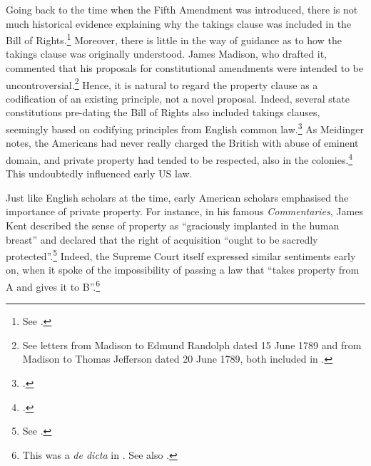 Going back to the time when the Fifth Amendment was introduced, there is not much historical evidence explaining why the takings clause was included in the Bill of Rights.\footnote{See \cite{fifth}.} Moreover, there is little in the way of guidance as to how the takings clause was originally understood. James Madison, who drafted it, commented that his proposals for constitutional amendments were intended to be uncontroversial.\footnote{See letters from Madison to Edmund Randolph dated 15 June 1789 and from Madison to Thomas Jefferson dated 20 June 1789, both included in \cite{madison79}.} Hence, it is natural to regard the property clause as a codification of an existing principle, not a novel proposal. Indeed, several state constitutions pre-dating the Bill of Rights also included takings clauses, seemingly based on codifying principles from English common law.\footcite[See][299]{johnson11} As Meidinger notes, the Americans had never really charged the British with abuse of eminent domain, and private property had tended to be respected, also in the colonies.\footcite[17]{meidinger80} This undoubtedly influenced early US law.

Just like English scholars at the time, early American scholars emphasised the importance of private property. For instance, in his famous {\it Commentaries}, James Kent described the sense of property as ``graciously implanted in the human breast'' and declared that the right of acquisition ``ought to be sacredly protected''.\footnote{See \cite[see][257]{kent27}.} Indeed, the Supreme Court itself expressed similar sentiments early on, when it spoke of the impossibility of passing a law that ``takes property from A and gives it to B''.\footnote{This was a {\it de dicta} in \cite[388]{calder98}. See also \cite[310]{vanhorne95}.}

